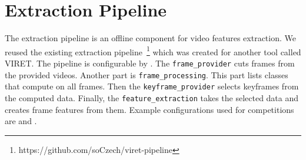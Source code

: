 \chapter{Extraction Pipeline}
\label{extraction-pipeline}


The extraction pipeline is an offline component for video features extraction. We reused the existing extraction pipeline~\footnote{https://github.com/soCzech/viret-pipeline} which was created for another tool called VIRET. The pipeline is configurable by . The \lstinline{frame_provider} cuts frames from the provided videos. Another part is \lstinline{frame_processing}. This part lists classes that compute on all frames. Then the \lstinline{keyframe_provider} selects keyframes from the computed data. Finally, the \lstinline{feature_extraction} takes the selected data and creates frame features from them. Example configurations used for competitions are  and .
